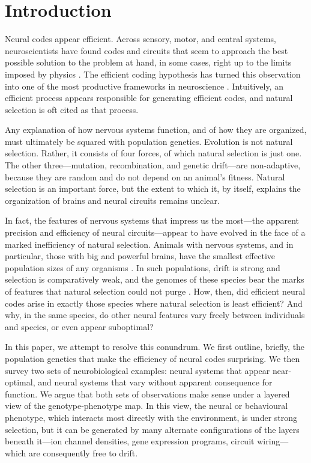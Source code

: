 \documentclass[twocolumn]{article}
\begin{document}
\section{Introduction}

Neural codes appear efficient. Across sensory, motor, and central systems, neuroscientists have found codes and circuits that seem to approach the best possible solution to the problem at hand, in some cases, right up to the limits imposed by physics \cite{barlow_1952, Barlow_1961, simoncelli_olshausen_2001}. The efficient coding hypothesis has turned this observation into one of the most productive frameworks in neuroscience \cite{Barlow_1961, barlow_2001, simoncelli_olshausen_2001}. Intuitively, an efficient process appears responsible for generating efficient codes, and natural selection is oft cited as that process.

Any explanation of how nervous systems function, and of how they are organized, must ultimately be squared with population genetics. Evolution is not natural selection. Rather, it consists of four forces, of which natural selection is just one. The other three---mutation, recombination, and genetic drift---are non-adaptive, because they are random and do not depend on an animal's fitness. Natural selection is an important force, but the extent to which it, by itself, explains the organization of brains and neural circuits remains unclear.

In fact, the features of nervous systems that impress us the most---the apparent precision and efficiency of neural circuits---appear to have evolved in the face of a marked inefficiency of natural selection. Animals with nervous systems, and in particular, those with big and powerful brains, have the smallest effective population sizes of any organisms \cite{Lynch_Conery_2003}. In such populations, drift is strong and selection is comparatively weak, and the genomes of these species bear the marks of features that natural selection could not purge \cite{Lynch_2007}. How, then, did efficient neural codes arise in exactly those species where natural selection is least efficient? And why, in the same species, do other neural features vary freely between individuals and species, or even appear suboptimal?

In this paper, we attempt to resolve this conundrum. We first outline, briefly, the population genetics that make the efficiency of neural codes surprising. We then survey two sets of neurobiological examples: neural systems that appear near-optimal, and neural systems that vary without apparent consequence for function. We argue that both sets of observations make sense under a layered view of the genotype-phenotype map. In this view, the neural or behavioural phenotype, which interacts most directly with the environment, is under strong selection, but it can be generated by many alternate configurations of the layers beneath it---ion channel densities, gene expression programs, circuit wiring---which are consequently free to drift.
\end{document}

